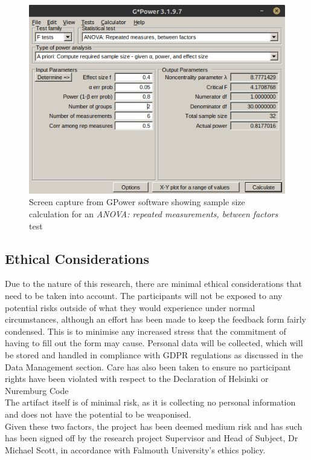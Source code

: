 \documentclass[journal]{IEEEtran}
\begin{document}
\begin{figure}[h!]
    \includegraphics[width=\columnwidth]{Images/ANOVA_2.png}
    \caption{Screen capture from GPower software showing sample size calculation for an \textit{ANOVA: repeated measurements, between factors} test}
    \label{ANOVArepeatedbetween}
\end{figure}

\subsection{Ethical Considerations}\label{Ethics}
Due to the nature of this research, there are minimal ethical considerations that need to be taken into account. The participants will not be exposed to any potential risks outside of what they would experience under normal circumstances, although an effort has been made to keep the feedback form fairly condensed. This is to minimise any increased stress that the commitment of having to fill out the form may cause. Personal data will be collected, which will be stored and handled in compliance with GDPR regulations as discussed in the Data Management section. Care has also been taken to ensure no participant rights have been violated with respect to the Declaration of Helsinki\cite{goodyear2007declaration} or Nuremburg Code\cite{code1949nuremberg}\\
The artifact itself is of minimal risk, as it is collecting no personal information and does not have the potential to be weaponised. \\
Given these two factors, the project has been deemed medium risk and has such has been signed off by the research project Supervisor and Head of Subject, Dr Michael Scott, in accordance with Falmouth University's ethics policy\cite{falethicspolicy}.
\end{document}
